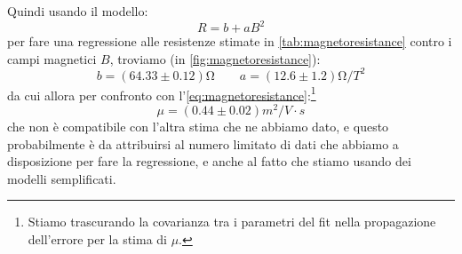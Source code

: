 Quindi usando il modello:
\begin{equation}
R = b + aB^2
\end{equation}
per fare una regressione alle resistenze stimate in \cref{tab:magnetoresistance} contro i campi magnetici $ B $, troviamo (in \cref{fig:magnetoresistance}):
\begin{equation}
b = (64.33 \pm 0.12) \unit{\ohm} \qquad a = (12.6 \pm 1.2) \unit{\ohm / T^2}
\end{equation}
da cui allora per confronto con l'\cref{eq:magnetoresistance}:\footnote{Stiamo trascurando la covarianza tra i parametri del fit nella propagazione dell'errore per la stima di $ \mu $.}
\begin{equation}
\mu = (0.44 \pm 0.02) \unit{m^2 / V \cdot s}
\end{equation}
che non è compatibile con l'altra stima che ne abbiamo dato, e questo probabilmente è da attribuirsi al numero limitato di dati che abbiamo a disposizione per fare la regressione, e anche al fatto che stiamo usando dei modelli semplificati.
